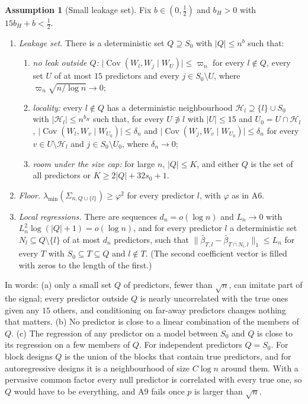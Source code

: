 \documentclass[11pt]{article}
\newcommand{\abs}[1]{\lvert #1\rvert}
\newcommand{\norm}[1]{\lVert #1\rVert}
\newcommand{\Cov}{\operatorname{Cov}}
\newcommand{\lmin}{\lambda_{\min}}
\newcommand{\Sz}{S_0}
\newcommand{\sz}{s_0}
\newcommand{\Hl}{\mathcal H}
\theoremstyle{plain}
\theoremstyle{definition}
\newtheorem{asm}{Assumption}
\begin{document}
\begin{asm}[Small leakage set]\label{a:leak}
Fix $b\in(0,\tfrac12)$ and $b_H>0$ with $15b_H+b<\tfrac12$.
\begin{enumerate}[label=(\alph*)]
  \item \emph{Leakage set.} There is a deterministic set $Q\supseteq\Sz$ with $\abs{Q}\le n^b$ such that:
    \begin{enumerate}[label=(\roman*),leftmargin=1.8em]
      \item \emph{no leak outside $Q$:} $\abs{\Cov(W_l,W_j\mid W_U)}\le\varpi_n$ for every $l\notin Q$, every set $U$ of
        at most $15$ predictors and every $j\in\Sz\setminus U$, where $\varpi_n\sqrt{n/\log n}\to0$;
      \item \emph{locality:} every $l\notin Q$ has a deterministic neighbourhood $\Hl_l\supseteq\{l\}\cup\Sz$ with
        $\abs{\Hl_l}\le n^{b_H}$ such that, for every $U\not\ni l$ with $\abs{U}\le15$ and $U_0=U\cap\Hl_l$,
        $\abs{\Cov(W_l,W_v\mid W_{U_0})}\le\delta_n$ and $\abs{\Cov(W_j,W_v\mid W_{U_0})}\le\delta_n$ for every
        $v\in U\setminus\Hl_l$ and $j\in\Sz\setminus U_0$, where $\delta_n\to0$;
      \item \emph{room under the size cap:} for large $n$, $\abs{Q}\le K$, and either $Q$ is the set of all predictors or
        $K\ge2\abs{Q}+32\sz+1$.
    \end{enumerate}
  \item \emph{Floor.} $\lmin(\Sigma_{n,Q\cup\{l\}})\ge\varphi^2$ for every predictor $l$, with $\varphi$ as in A6.
  \item \emph{Local regressions.} There are sequences $d_n=o(\log n)$ and $L_n\to0$ with
    $L_n^2\log(\abs{Q}+1)=o(\log n)$, and for every predictor $l$ a deterministic set $N_l\subseteq Q\setminus\{l\}$ of at
    most $d_n$ predictors, such that $\norm{\bar\beta_{T,l}-\bar\beta_{T\cap N_l,l}}_1\le L_n$ for every $T$ with
    $\Sz\subseteq T\subseteq Q$ and $l\notin T$. (The second coefficient vector is filled with zeros to the length of the
    first.)
\end{enumerate}
\end{asm}
\noindent In words: (a) only a small set $Q$ of predictors, fewer than $\sqrt n$, can imitate part of the signal; every
predictor outside $Q$ is nearly uncorrelated with the true ones given any $15$ others, and conditioning on far-away
predictors changes nothing that matters. (b) No predictor is close to a linear combination of the members of $Q$. (c)
The regression of any predictor on a model between $\Sz$ and $Q$ is close to its regression on a few members of $Q$.
For independent predictors $Q=\Sz$. For block designs $Q$ is the union of the blocks that contain true predictors, and
for autoregressive designs it is a neighbourhood of size $C\log n$ around them. With a pervasive common factor every
null predictor is correlated with every true one, so $Q$ would have to be everything, and A9 fails once $p$ is larger
than $\sqrt n$.
\end{document}
